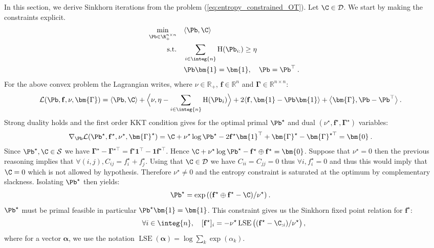 In this section, we derive Sinkhorn iterations from the problem (\ref{eq:entropy_constrained_OT}). Let $\C \in \mathcal{D}$. We start by making the constraints explicit.
\begin{align}
    \min_{\Pb \in \R_+^{n \times n}} \quad &\langle \Pb, \C \rangle \\
    \text{s.t.} \quad &\sum_{i \in \integ{n}} \operatorname{H}(\Pb_{i:}) \geq \eta \\
    & \Pb \bm{1} = \bm{1}, \quad \Pb = \Pb^\top \:.
\end{align}
For the above convex problem the Lagrangian writes, where $\nu \in \mathbb{R}_+$, $\mathbf{f} \in \mathbb{R}^n$ and $\bm{\Gamma} \in \mathbb{R}^{n \times n}$:
\begin{align}
    \mathcal{L}(\Pb, \mathbf{f}, \nu, \bm{\Gamma}) &= \langle \Pb, \C \rangle + \Big\langle \nu, \eta - \sum_{i \in \integ{n}} \operatorname{H}(\Pb_i) \Big\rangle + 2\langle \mathbf{f}, \bm{1} - \Pb \bm{1} \rangle + \big\langle \bm{\Gamma}, \Pb - \Pb^\top \big\rangle \:.
\end{align}
Strong duality holds and the first order KKT condition gives for the optimal primal $\Pb^\star$ and dual $(\nu^\star, \mathbf{f}^\star, \bm{\Gamma}^\star)$ variables: 
\begin{align}
    \nabla_{\Pb} \mathcal{L}(\Pb^\star, \mathbf{f}^\star, \nu^\star, \bm{\Gamma}^\star) &= \C + \nu^\star \log{\Pb^\star} - 2\mathbf{f}^\star \bm{1}^\top + \bm{\Gamma}^\star - \bm{\Gamma}^{\star\top} = \bm{0} \:.
\end{align}
Since $\Pb^\star, \C \in \mathcal{S}$ we have $\bm{\Gamma}^\star - \bm{\Gamma}^{\star\top} = \mathbf{f}^\star \bm{1}^\top - \bm{1}\mathbf{f}^{\star \top}$. Hence $\C + \nu^\star \log{\Pb^\star} - \mathbf{f}^\star \oplus \mathbf{f}^\star = \bm{0}$. Suppose that $\nu^\star = 0$ then the previous reasoning implies that $\forall (i,j), C_{ij} = f_i^\star + f_j^\star$. Using that $\C \in \mathcal{D}$ we have $C_{ii} = C_{jj} = 0$ thus $\forall i,  f^\star_i = 0$ and thus this would imply that $\C = 0$ which is not allowed by hypothesis. Therefore $\nu^\star \neq 0$ and the entropy constraint is saturated at the optimum by complementary slackness. Isolating $\Pb^\star$ then yields:
\begin{align}
    \Pb^{\star} &= \exp{\left( (\mathbf{f}^\star \oplus \mathbf{f}^{\star} - \C) / \nu^\star \right)} \:.
\end{align}
$\Pb^\star$ must be primal feasible in particular $\Pb^\star \bm{1} = \bm{1}$. This constraint gives us the Sinkhorn fixed point relation for $\mathbf{f}^\star$:
\begin{align}
    \forall i \in \integ{n}, \quad [\mathbf{f}^\star]_i = - \nu^\star \operatorname{LSE} \big((\mathbf{f}^\star - \C_{:i}) / \nu^\star \big)\,,
\end{align}
where for a vector $\bm{\alpha}$, we use the notation
$\operatorname{LSE}(\bm{\alpha}) = \log \sum_{k} \exp (\alpha_k)$.



